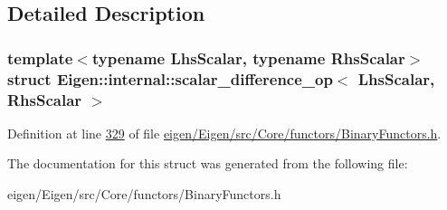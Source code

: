 \subsection{Detailed Description}
\subsubsection*{template$<$typename Lhs\+Scalar, typename Rhs\+Scalar$>$\newline
struct Eigen\+::internal\+::scalar\+\_\+difference\+\_\+op$<$ Lhs\+Scalar, Rhs\+Scalar $>$}



Definition at line \hyperlink{eigen_2_eigen_2src_2_core_2functors_2_binary_functors_8h_source_l00329}{329} of file \hyperlink{eigen_2_eigen_2src_2_core_2functors_2_binary_functors_8h_source}{eigen/\+Eigen/src/\+Core/functors/\+Binary\+Functors.\+h}.



The documentation for this struct was generated from the following file\+:\begin{DoxyCompactItemize}
\item 
eigen/\+Eigen/src/\+Core/functors/\+Binary\+Functors.\+h\end{DoxyCompactItemize}
